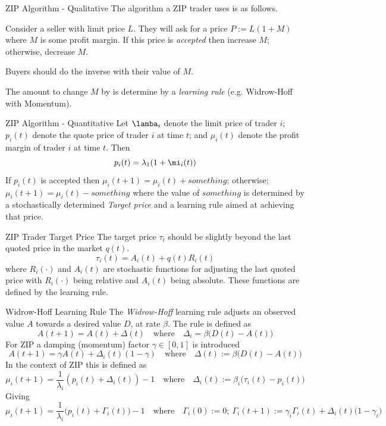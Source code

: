 \documentclass[11pt,a4paper]{article}
\begin{document}
\begin{proposition}{ZIP Algorithm - Qualitative}
  The algorithm a ZIP trader uses is as follows.
  \par Consider a seller with limit price $L$. They will ask for a price $P:=L(1+M)$ where $M$ is some profit margin. If this price is \textit{accepted} then increase $M$; otherwise, decrease $M$.
  \par Buyers should do the inverse with their value of $M$.
  \par The amount to change $M$ by is determine by a \textit{learning rule} (e.g. Widrow-Hoff with Momentum).
\end{proposition}

\begin{proposition}{ZIP Algorithm - Quantitative}
  Let $\lamba_i$ denote the limit price of trader $i$; $p_i(t)$ denote the quote price of trader $i$ at time $t$; and $\mu_i(t)$ denote the profit margin of trader $i$ at time $t$. Then
  \[ p_i(t)=\lambda_1(1+\mi_i(t)) \]
  If $p_i(t)$ is accepted then $\mu_i(t+1)=\mu_i(t)+something$; otherwise; $\mu_i(t+1)=\mu_i(t)-something$ where the value of $something$ is determined by a stochastically determined \textit{Target price} and a learning rule aimed at achieving that price.
\end{proposition}

\begin{proposition}{ZIP Trader Target Price}
  The target price $\tau_i$ should be slightly beyond the last quoted price in the market $q(t)$.
  \[ \tau_i(t)=A_i(t)+q(t)R_i(t) \]
  where $R_i(\cdot)$ and $A_i(t)$ are stochastic functions for adjusting the last quoted price with $R_i(\cdot)$ being relative and $A_i(t)$ being absolute. These functions are defined by the learning rule.
\end{proposition}

\begin{definition}{Widrow-Hoff Learning Rule}
  The \textit{Widrow-Hoff} learning rule adjusts an observed value $A$ towards a desired value $D$, at rate $\beta$. The rule is defined as
  \[ A(t+1)=A(t)+\Delta(t)\quad\text{where}\quad\Delta_i=\beta\big(D(t)-A(t)\big) \]
  For ZIP a damping (momentum) factor $\gamma\in[0,1]$ is introduced
  \[ A(t+1)=\gamma A(t)+\Delta_i(t)(1-\gamma)\quad\text{where}\quad\Delta(t):=\beta\big(D(t)-A(t)\big) \]
  In the context of ZIP this is defined as
  \[ \mu_i(t+1)=\frac1{\lambda_i}(p_i(t)+\Delta_i(t))-1\quad\text{where}\quad\Delta_i(t):=\beta_i\big(\tau_i(t)-p_i(t)\big) \]
  Giving
  \[ \mu_i(t+1)=\frac1{\lambda_i}\big(p_i(t)+\Gamma_i(t)\big)-1\quad\text{where}\quad\Gamma_i(0):=0;\ \Gamma_i(t+1):=\gamma_i\Gamma_i(t)+\Delta_i(t)\big(1-\gamma_i\big) \]
\end{definition}
\end{document}
